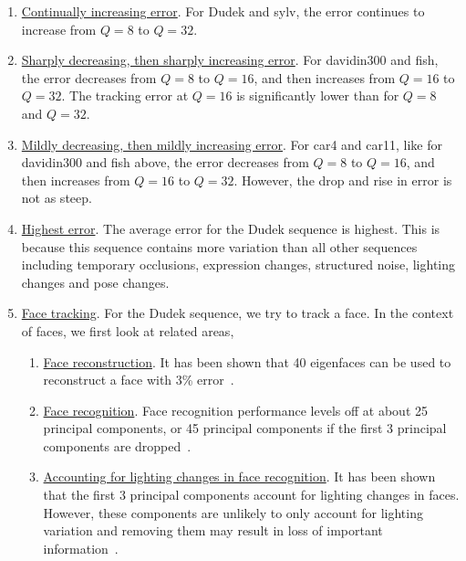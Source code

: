 \begin{enumerate}
\item \underline{Continually increasing error}.  For Dudek and sylv, the error continues to increase from $Q=8$ to $Q=32$.
\item \underline{Sharply decreasing, then sharply increasing error}. For davidin300 and fish, the error decreases from $Q=8$ to $Q=16$, and then increases from $Q=16$ to $Q=32$.   The tracking error at $Q=16$ is significantly lower than for $Q=8$ and $Q=32$.
\item \underline{Mildly decreasing, then mildly increasing error}.  For car4 and car11, like for davidin300 and fish above, the error decreases from $Q=8$ to $Q=16$, and then increases from $Q=16$ to $Q=32$.  However, the drop and rise in error is not as steep.
\item \underline{Highest error}.  The average error for the Dudek sequence is highest.  This is because this sequence contains more variation than all other sequences including temporary occlusions, expression changes, structured noise, lighting changes and pose changes.  
\item \underline{Face tracking}.  For the Dudek sequence, we try to track a face.  In the context of faces, we first look at related areas,

\begin{enumerate}
\item \underline{Face reconstruction}.  It has been shown that 40 eigenfaces can be used to reconstruct a face with 3\% error~\cite{1987_JNL_Faces_Sirovich}.
\item \underline{Face recognition}.  Face recognition performance levels off at about 25 principal components, or 45 principal components if the first 3 principal components are dropped~\cite{1997_JNL_EigenVsFisherFaces_Bel}.
\item \underline{Accounting for lighting changes in face recognition}.  It has been shown that the first 3 principal components account for lighting changes in faces.  However, these components are unlikely to only account for lighting variation and removing them may result in loss of important information~\cite{1997_JNL_EigenVsFisherFaces_Bel}.
\end{enumerate}


\end{enumerate}
